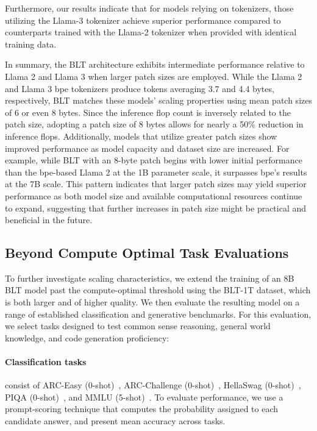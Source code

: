 Furthermore, our results indicate that for models relying on tokenizers, those utilizing the Llama-3 tokenizer achieve superior performance compared to counterparts trained with the Llama-2 tokenizer when provided with identical training data.

In summary, the {\textsc BLT} architecture exhibits intermediate performance relative to Llama 2 and Llama 3 when larger patch sizes are employed. While the Llama 2 and Llama 3 bpe tokenizers produce tokens averaging 3.7 and 4.4 bytes, respectively, {\textsc BLT} matches these models’ scaling properties using mean patch sizes of 6 or even 8 bytes. Since the inference flop count is inversely related to the patch size, adopting a patch size of 8 bytes allows for nearly a 50\% reduction in inference flops. Additionally, models that utilize greater patch sizes show improved performance as model capacity and dataset size are increased. For example, while {\textsc BLT} with an 8-byte patch begins with lower initial performance than the bpe-based Llama 2 at the 1B parameter scale, it surpasses bpe’s results at the 7B scale. This pattern indicates that larger patch sizes may yield superior performance as both model size and available computational resources continue to expand, suggesting that further increases in patch size might be practical and beneficial in the future.

\subsection{Beyond Compute Optimal Task Evaluations}
\label{section:evals}
To further investigate scaling characteristics, we extend the training of an 8B {\textsc BLT} model past the compute-optimal threshold using the {\textsc BLT}-1T dataset, which is both larger and of higher quality. We then evaluate the resulting model on a range of established classification and generative benchmarks. For this evaluation, we select tasks designed to test common sense reasoning, general world knowledge, and code generation proficiency:
\paragraph{Classification tasks} consist of ARC-Easy (0-shot)~\citep{Eval_ARC}, ARC-Challenge (0-shot)~\citep{Eval_ARC}, HellaSwag (0-shot)~\citep{Eval_hellaswag}, PIQA (0-shot)~\citep{Eval_piqa}, and MMLU (5-shot)~\citep{hendrycks2020measuring}. To evaluate performance, we use a prompt-scoring technique that computes the probability assigned to each candidate answer, and present mean accuracy across tasks.
